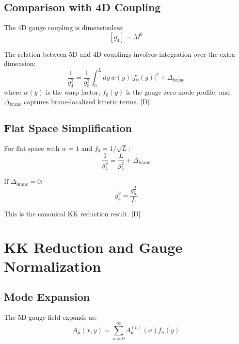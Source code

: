 \documentclass[11pt,a4paper]{article}
\newcommand{\tagD}{\textcolor{blue!70!black}{[D]}}
\begin{document}
\subsection{Comparison with 4D Coupling}

The 4D gauge coupling is dimensionless:
\begin{equation}
\label{eq:g4-dim}
[g_4] = M^0
\end{equation}

The relation between 5D and 4D couplings involves integration over the extra dimension:
\begin{equation}
\label{eq:g4-g5-general}
\frac{1}{g_4^2} = \frac{1}{g_5^2} \int_0^L dy\, w(y) |f_0(y)|^2 + \Delta_{\text{brane}}
\end{equation}
where $w(y)$ is the warp factor, $f_0(y)$ is the gauge zero-mode profile, and
$\Delta_{\text{brane}}$ captures brane-localized kinetic terms. \tagD

\subsection{Flat Space Simplification}

For flat space with $w = 1$ and $f_0 = 1/\sqrt{L}$:
\begin{equation}
\label{eq:g4-g5-flat}
\frac{1}{g_4^2} = \frac{L}{g_5^2} + \Delta_{\text{brane}}
\end{equation}

If $\Delta_{\text{brane}} = 0$:
\begin{equation}
\label{eq:g4-g5-simple}
g_4^2 = \frac{g_5^2}{L}
\end{equation}

This is the canonical KK reduction result. \tagD

\section{KK Reduction and Gauge Normalization}

\subsection{Mode Expansion}

The 5D gauge field expands as:
\begin{equation}
\label{eq:mode-expansion}
A_\mu(x,y) = \sum_{n=0}^{\infty} A_\mu^{(n)}(x) f_n(y)
\end{equation}
\end{document}
